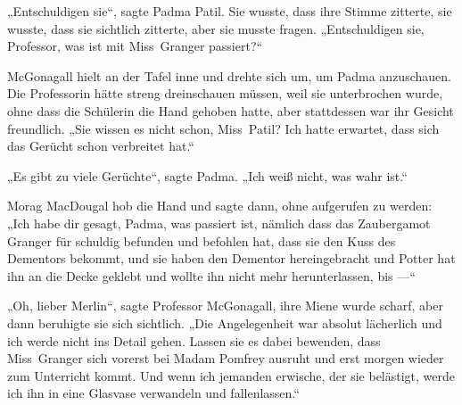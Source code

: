 „Entschuldigen sie“, sagte Padma Patil. Sie wusste, dass ihre Stimme zitterte, sie wusste, dass sie sichtlich zitterte, aber sie musste fragen.
„Entschuldigen sie, Professor, was ist mit Miss~Granger passiert?“

McGonagall hielt an der Tafel inne und drehte sich um, um Padma anzuschauen. Die Professorin hätte streng dreinschauen müssen, weil sie unterbrochen wurde, ohne dass die Schülerin die Hand gehoben hatte, aber stattdessen war ihr Gesicht freundlich.
„Sie wissen es nicht schon, Miss~Patil? Ich hatte erwartet, dass sich das Gerücht schon verbreitet hat.“

„Es gibt zu viele Gerüchte“, sagte Padma.
„Ich weiß nicht, was wahr ist.“

Morag MacDougal hob die Hand und sagte dann, ohne aufgerufen zu werden:
„Ich habe dir gesagt, Padma, was passiert ist, nämlich dass das Zaubergamot Granger für schuldig befunden und befohlen hat, dass sie den Kuss des Dementors bekommt, und sie haben den Dementor hereingebracht und Potter hat ihn an die Decke geklebt und wollte ihn nicht mehr herunterlassen, bis —“

„Oh, lieber Merlin“, sagte Professor McGonagall, ihre Miene wurde scharf, aber dann beruhigte sie sich sichtlich.
„Die Angelegenheit war absolut lächerlich und ich werde nicht ins Detail gehen. Lassen sie es dabei bewenden, dass Miss~Granger sich vorerst bei Madam Pomfrey ausruht und erst morgen wieder zum Unterricht kommt. Und wenn ich jemanden erwische, der sie belästigt, werde ich ihn in eine Glasvase verwandeln und fallenlassen.“

